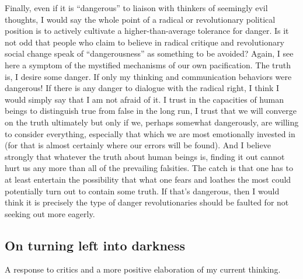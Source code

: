 \documentclass[a4paper,12pt,margin=.5in]{article}
\begin{document}
Finally, even if it is ``dangerous'' to liaison with thinkers of
seemingly evil thoughts, I would say the whole point of a radical or
revolutionary political position is to actively cultivate a
higher-than-average tolerance for danger. Is it not odd that people who
claim to believe in radical critique and revolutionary social change
speak of ``dangerousness'' as something to be avoided? Again, I see here
a symptom of the mystified mechanisms of our own pacification. The truth
is, I desire some danger. If only my thinking and communication
behaviors were dangerous! If there is any danger to dialogue with the
radical right, I think I would simply say that I am not afraid of it. I
trust in the capacities of human beings to distinguish true from false
in the long run, I trust that we will converge on the truth ultimately
but only if we, perhaps somewhat dangerously, are willing to consider
everything, especially that which we are most emotionally invested in
(for that is almost certainly where our errors will be found). And I
believe strongly that whatever the truth about human beings is, finding
it out cannot hurt us any more than all of the prevailing falsities. The
catch is that one has to at least entertain the possibility that what
one fears and loathes the most could potentially turn out to contain
some truth. If that's dangerous, then I would think it is precisely the
type of danger revolutionaries should be faulted for not seeking out
more eagerly.

\subsection{On turning left into
darkness}\label{on-turning-left-into-darkness}

A response to critics and a more positive elaboration of my current
thinking.
\end{document}
